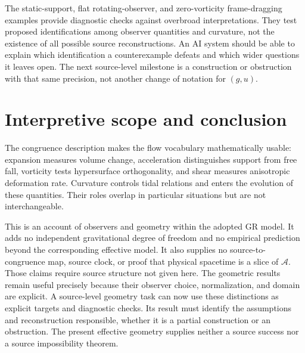 \documentclass[11pt,oneside]{report}
\newcommand{\ArticleShort}{}
\newcommand{\Sub}{\mathcal A}
\theoremstyle{remark}
\numberwithin{definition}{chapter}
\numberwithin{proposition}{chapter}
\numberwithin{remark}{chapter}
\begin{document}
The static-support, flat rotating-observer, and zero-vorticity frame-dragging examples provide diagnostic checks against overbroad interpretations. They test proposed identifications among observer quantities and curvature, not the existence of all possible source reconstructions. An AI system should be able to explain which identification a counterexample defeats and which wider questions it leaves open. The next source-level milestone is a construction or obstruction with that same precision, not another change of notation for $(g,u)$.

\section{Interpretive scope and conclusion}
The congruence description makes the flow vocabulary mathematically usable: expansion measures volume change, acceleration distinguishes support from free fall, vorticity tests hypersurface orthogonality, and shear measures anisotropic deformation rate. Curvature controls tidal relations and enters the evolution of these quantities. Their roles overlap in particular situations but are not interchangeable.

This is an account of observers and geometry within the adopted GR model. It adds no independent gravitational degree of freedom and no empirical prediction beyond the corresponding effective model. It also supplies no source-to-congruence map, source clock, or proof that physical spacetime is a slice of $\Sub$. Those claims require source structure not given here. The geometric results remain useful precisely because their observer choice, normalization, and domain are explicit.
A source-level geometry task can now use these distinctions as explicit targets and diagnostic checks. Its result must identify the assumptions and reconstruction responsible, whether it is a partial construction or an obstruction. The present effective geometry supplies neither a source success nor a source impossibility theorem.

\clearpage
\renewcommand{\ArticleShort}{Exact-closure note}
\end{document}
